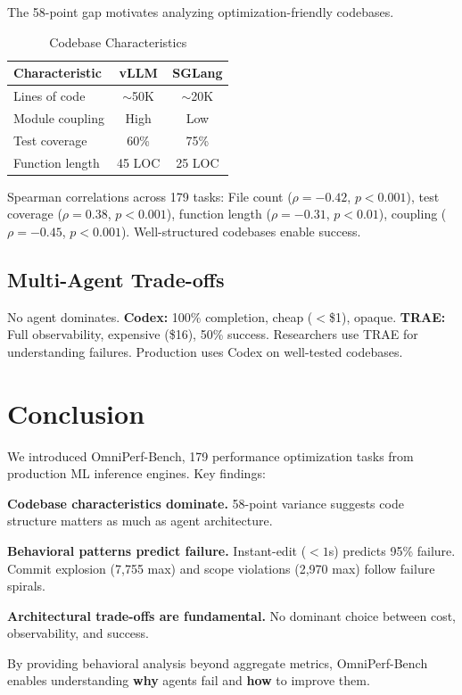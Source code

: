 \documentclass{article}
\theoremstyle{plain}
\theoremstyle{definition}
\theoremstyle{remark}
\begin{document}
The 58-point gap motivates analyzing optimization-friendly codebases.

\begin{table}[t]
\caption{Codebase Characteristics}
\label{tab:codebase}
\centering
\small
\begin{tabular}{lcc}
\toprule
\textbf{Characteristic} & \textbf{vLLM} & \textbf{SGLang} \\
\midrule
Lines of code & $\sim$50K & $\sim$20K \\
Module coupling & High & Low \\
Test coverage & 60\% & 75\% \\
Function length & 45 LOC & 25 LOC \\
\bottomrule
\end{tabular}
\end{table}

Spearman correlations across 179 tasks: File count ($\rho = -0.42$, $p < 0.001$), test coverage ($\rho = 0.38$, $p < 0.001$), function length ($\rho = -0.31$, $p < 0.01$), coupling ($\rho = -0.45$, $p < 0.001$). Well-structured codebases enable success.

\subsection{Multi-Agent Trade-offs}

No agent dominates. \textbf{Codex:} 100\% completion, cheap ($<$\$1), opaque. \textbf{TRAE:} Full observability, expensive (\$16), 50\% success. Researchers use TRAE for understanding failures. Production uses Codex on well-tested codebases.

\section{Conclusion}
\label{sec:conclusion}

We introduced OmniPerf-Bench, 179 performance optimization tasks from production ML inference engines. Key findings:

\textbf{Codebase characteristics dominate.} 58-point variance suggests code structure matters as much as agent architecture.

\textbf{Behavioral patterns predict failure.} Instant-edit ($<1$s) predicts 95\% failure. Commit explosion (7,755 max) and scope violations (2,970 max) follow failure spirals.

\textbf{Architectural trade-offs are fundamental.} No dominant choice between cost, observability, and success.

By providing behavioral analysis beyond aggregate metrics, OmniPerf-Bench enables understanding \textbf{why} agents fail and \textbf{how} to improve them.



\end{document}
